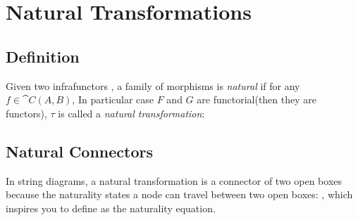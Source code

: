 \section{Natural Transformations}

\subsection{Definition}

Given two infrafunctors
, a family of morphisms
is \textit{natural} if for any $f \in \cat{C}(A,B)$,
In particular case $F$ and $G$ are functorial(then they are functors), $\tau$ is called a \textit{natural transformation}:

\subsection{Natural Connectors}

In string diagrams, a natural transformation is a connector of two open boxes
because the naturality states a node can travel between two open boxes:
, which inspires you to define
as the naturality equation.



